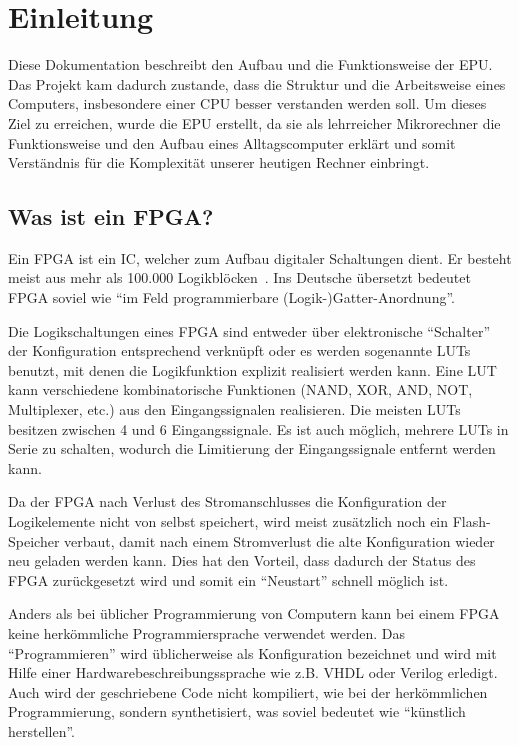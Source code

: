 \chapter{Einleitung}
\label{c:einleitung}
Diese Dokumentation beschreibt den Aufbau und die Funktionsweise der \ac{EPU}.
Das Projekt kam dadurch zustande, dass die Struktur und die Arbeitsweise eines
Computers, insbesondere einer \ac{CPU} besser verstanden werden soll. Um dieses
Ziel zu erreichen, wurde die \ac{EPU} erstellt, da sie als lehrreicher
Mikrorechner die Funktionsweise und den Aufbau eines Alltagscomputer erklärt und
somit Verständnis für die Komplexität unserer heutigen Rechner einbringt.

\section{Was ist ein FPGA?}
Ein \ac{FPGA} ist ein \ac{IC}, welcher zum Aufbau digitaler Schaltungen
dient. Er besteht meist aus mehr als 100.000 Logikblöcken~\cite[S. 8]{minicpu}.
Ins Deutsche übersetzt bedeutet \ac{FPGA} soviel wie "`im Feld programmierbare
(Logik-)Gatter-Anordnung"'.

Die Logikschaltungen eines \ac{FPGA} sind entweder über elektronische "`Schalter"'
der Konfiguration entsprechend verknüpft oder es werden sogenannte \acp{LUT}
benutzt, mit denen die Logikfunktion explizit realisiert werden kann. Eine
\ac{LUT} kann verschiedene kombinatorische Funktionen (NAND, XOR, AND, NOT,
Multiplexer, etc.) aus den Eingangssignalen realisieren. Die meisten \acp{LUT}
besitzen zwischen 4 und 6 Eingangssignale. Es ist auch möglich, mehrere
\acp{LUT} in Serie zu schalten, wodurch die Limitierung der Eingangssignale
entfernt werden kann.~\cite{FPGA_Aufbau}

Da der \ac{FPGA} nach Verlust des Stromanschlusses die Konfiguration der
Logikelemente nicht von selbst speichert, wird meist zusätzlich noch ein
Flash-Speicher verbaut, damit nach einem Stromverlust die alte Konfiguration
wieder neu geladen werden kann. Dies hat den Vorteil, dass dadurch der
Status des \ac{FPGA} zurückgesetzt wird und somit ein "`Neustart"' schnell möglich
ist.

Anders als bei üblicher Programmierung von Computern kann bei einem \ac{FPGA}
keine herkömmliche Programmiersprache verwendet werden. Das "`Programmieren"' wird
üblicherweise als Konfiguration bezeichnet und wird mit Hilfe einer
Hardwarebeschreibungssprache wie z.B. VHDL oder Verilog erledigt. Auch wird der
geschriebene Code nicht kompiliert, wie bei der herkömmlichen Programmierung,
sondern synthetisiert, was soviel bedeutet wie "`künstlich herstellen"'.
